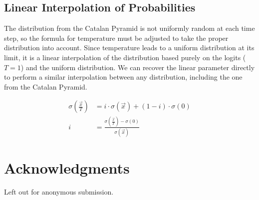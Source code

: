 \documentclass[11pt,a4paper]{article}
\begin{document}
\subsection{Linear Interpolation of Probabilities}

The distribution from the Catalan Pyramid is not uniformly random at each time step, so the formula for temperature must be adjusted to take the proper distribution into account. Since temperature leads to a uniform distribution at its limit, it is a linear interpolation of the distribution based purely on the logits ($T = 1$) and the uniform distribution. We can recover the linear parameter directly to perform a similar interpolation between any distribution, including the one from the Catalan Pyramid.

\begin{align}
\sigma(\frac{\vec{x}}{T}) &= i \cdot \sigma(\vec{x}) + (1 - i) \cdot \sigma(0) \\
i &= \frac{\sigma(\frac{\vec{x}}{T}) - \sigma(0)}{\sigma(\vec{x})}
\end{align}


\section*{Acknowledgments}

Left out for anonymous submission.


%
%


\end{document}
